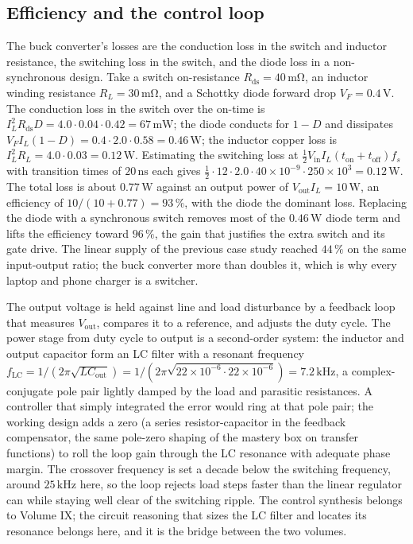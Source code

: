 \subsection{Efficiency and the control loop}

The buck converter's losses are the conduction loss in the switch and
inductor resistance, the switching loss in the switch, and the diode loss
in a non-synchronous design. Take a switch on-resistance $R_{\text{ds}} =
40\,\si{\milli\ohm}$, an inductor winding resistance $R_{L} = 30\,\si{
\milli\ohm}$, and a Schottky diode forward drop $V_{F} = 0.4\,\si{\volt}$.
The conduction loss in the switch over the on-time is $I_{L}^{2}R_{\text{
ds}}D = 4.0\cdot 0.04\cdot 0.42 = 67\,\si{\milli\watt}$; the diode
conducts for $1-D$ and dissipates $V_{F}I_{L}(1-D) = 0.4\cdot 2.0\cdot
0.58 = 0.46\,\si{\watt}$; the inductor copper loss is $I_{L}^{2}R_{L} =
4.0\cdot 0.03 = 0.12\,\si{\watt}$. Estimating the switching loss at
$\tfrac{1}{2}V_{\text{in}}I_{L}(t_{\text{on}}+t_{\text{off}})f_{s}$ with
transition times of $20\,\si{\nano\second}$ each gives $\tfrac{1}{2}\cdot
12\cdot 2.0\cdot 40\times 10^{-9}\cdot 250\times 10^{3} = 0.12\,\si{
\watt}$. The total loss is about $0.77\,\si{\watt}$ against an output power
of $V_{\text{out}}I_{L} = 10\,\si{\watt}$, an efficiency of $10/(10+0.77)
= 93\,\%$, with the diode the dominant loss. Replacing the diode with a
synchronous switch removes most of the $0.46\,\si{\watt}$ diode term and
lifts the efficiency toward $96\,\%$, the gain that justifies the extra
switch and its gate drive. The linear supply of the previous case study
reached $44\,\%$ on the same input-output ratio; the buck converter more
than doubles it, which is why every laptop and phone charger is a
switcher.

The output voltage is held against line and load disturbance by a
feedback loop that measures $V_{\text{out}}$, compares it to a reference,
and adjusts the duty cycle. The power stage from duty cycle to output is a
second-order system: the inductor and output capacitor form an LC filter
with a resonant frequency $f_{\text{LC}} = 1/(2\pi\sqrt{L C_{\text{out}}})
= 1/(2\pi\sqrt{22\times 10^{-6}\cdot 22\times 10^{-6}}) = 7.2\,\si{\kilo
\hertz}$, a complex-conjugate pole pair lightly damped by the load and
parasitic resistances. A controller that simply integrated the error would
ring at that pole pair; the working design adds a zero (a series
resistor-capacitor in the feedback compensator, the same pole-zero shaping
of the mastery box on transfer functions) to roll the loop gain through
the LC resonance with adequate phase margin. The crossover frequency is
set a decade below the switching frequency, around $25\,\si{\kilo\hertz}$
here, so the loop rejects load steps faster than the linear regulator can
while staying well clear of the switching ripple. The control synthesis
belongs to Volume IX; the circuit reasoning that sizes the LC filter and
locates its resonance belongs here, and it is the bridge between the two
volumes.

